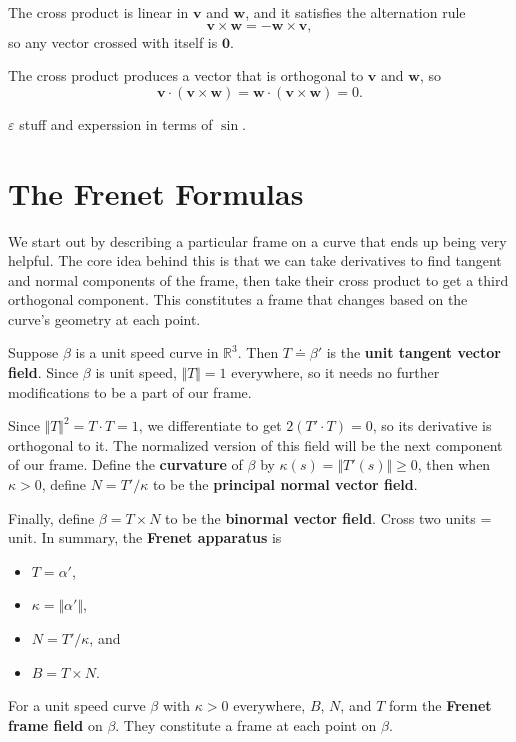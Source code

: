 \documentclass[10pt]{report}
\begin{document}
The cross product is linear in $\mathbf{v}$ and $\mathbf{w}$, and it satisfies the alternation rule
\[
\mathbf{v} \times \mathbf{w} = -\mathbf{w}\times \mathbf{v},
\] so any vector crossed with itself is $\mathbf{0}$.

The cross product produces a vector that is orthogonal to $\mathbf{v}$ and $\mathbf{w}$, so
\[
	\mathbf{v} \cdot (\mathbf{v}\times \mathbf{w}) = \mathbf{w}\cdot (\mathbf{v}\times \mathbf{w}) = 0.
\] 

{\color{red}$\varepsilon$ stuff and experssion in terms of $\sin$.}


\section{The Frenet Formulas}

We start out by describing a particular frame on a curve that ends up being very helpful. The core idea behind this is that we can take derivatives to find tangent and normal components of the frame, then take their cross product to get a third orthogonal component. This constitutes a frame that changes based on the curve's geometry at each point.

Suppose $\beta$ is a unit speed curve in $\mathbb{R}^3$. Then $T\doteq\beta'$ is the \textbf{unit tangent vector field}. Since $\beta$ is unit speed, $\Vert{T}\Vert=1$ everywhere, so it needs no further modifications to be a part of our frame.

Since $\Vert{T}\Vert^2 = T\cdot T=1$, we differentiate to get $2(T'\cdot T)=0$, so its derivative is orthogonal to it. The normalized version of this field will be the next component of our frame. Define the \textbf{curvature} of $\beta$ by $\kappa(s) = \Vert{T'(s)}\Vert\geq 0$, then when $\kappa > 0$, define $N = T' / \kappa$ to be the \textbf{principal normal vector field}.

Finally, define $\beta = T \times N$ to be the \textbf{binormal vector field}. {\color{red}Cross two units = unit.} In summary, the \textbf{Frenet apparatus} is
\begin{itemize}
	\item $T=\alpha'$,
	\item $\kappa = \Vert{\alpha'}\Vert$,
	\item $N = T' / \kappa$, and
	\item $B = T \times N$.
\end{itemize}
\begin{defn}[]
	For a unit speed curve $\beta$ with $\kappa>0$ everywhere, $B$, $N$, and $T$ form the \textbf{Frenet frame field} on $\beta$. They constitute a frame at each point on $\beta$.
\end{defn}
\end{document}
